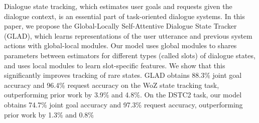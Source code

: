 Dialogue state tracking, which estimates user goals and requests given the dialogue context, is an essential part of task-oriented dialogue systems. In this paper, we propose the Global-Locally Self-Attentive Dialogue State Tracker (GLAD), which learns representations of the user utterance and previous system actions with global-local modules. Our model uses global modules to shares parameters between estimators for different types (called slots) of dialogue states, and uses local modules to learn slot-specific features. We show that this significantly improves tracking of rare states. GLAD obtains 88.3\% joint goal accuracy and 96.4\% request accuracy on the WoZ state tracking task, outperforming prior work by 3.9\% and 4.8\%. On the DSTC2 task, our model obtains 74.7\% joint goal accuracy and 97.3\% request accuracy, outperforming prior work by 1.3\% and 0.8\%
